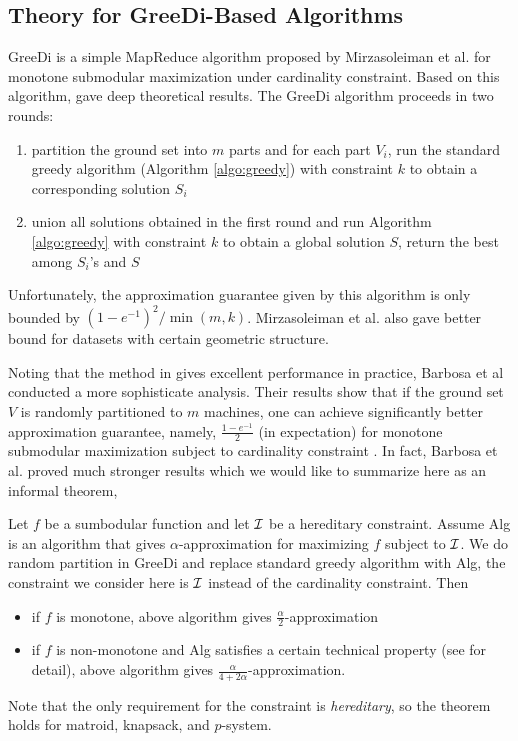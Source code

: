 \subsection{Theory for {\sc GreeDi}-Based Algorithms}
{\sc GreeDi} is a simple MapReduce algorithm proposed by  Mirzasoleiman et al. \cite{MKS+13} for monotone submodular maximization under cardinality constraint. Based on this algorithm, \cite{DEN+15,MZ15} gave deep theoretical results. The {\sc GreeDi} algorithm proceeds in two rounds:
\begin{enumerate}
\item partition the ground set into $m$ parts and for each part $V_i$, run the standard greedy algorithm (Algorithm \ref{algo:greedy}) with constraint $k$ to obtain a corresponding solution $S_i$
\item union all solutions obtained in the first round and run Algorithm \ref{algo:greedy} with constraint $k$ to obtain a global solution $S$, return the best among $S_i$'s and $S$
\end{enumerate}

Unfortunately, the approximation guarantee given by this algorithm is only bounded by $(1 - e^{-1})^2/\min(m, k)$. Mirzasoleiman et al. \cite{MKS+13} also gave better bound for datasets with certain geometric structure.

Noting that the method in \cite{MKS+13} gives excellent performance in practice, Barbosa et al \cite{DEN+15} conducted a more sophisticate analysis. Their results show that if the ground set $V$ is randomly partitioned to $m$ machines, one can achieve significantly better approximation guarantee, namely, $\frac{1 - e^{-1}}{2}$ (in expectation) for monotone submodular maximization subject to cardinality constraint . In fact, Barbosa et al. \cite{DEN+15} proved much stronger results which we would like to summarize here as an informal theorem,
\begin{theorem}
  \label{thm:randomGreeDi}
  Let $f$ be a sumbodular function and let $\mathcal{I}$ be a hereditary constraint. Assume {\sc Alg} is an algorithm that gives $\alpha$-approximation for maximizing $f$ subject to $\mathcal{I}$. We do random partition in {\sc GreeDi} and replace standard greedy algorithm with {\sc Alg}, the constraint we consider here is $\mathcal{I}$ instead of the cardinality constraint. Then 
  \begin{itemize}
  \item if $f$ is monotone, above algorithm gives $\frac{\alpha}{2}$-approximation
  \item if $f$ is non-monotone and {\sc Alg} satisfies a certain technical property (see \cite{DEN+15} for detail), above algorithm gives $\frac{\alpha}{4 + 2\alpha}$-approximation.
  \end{itemize}
\end{theorem}
Note that the only requirement for the constraint is \emph{hereditary}, so the theorem holds for matroid, knapsack, and $p$-system.
 


